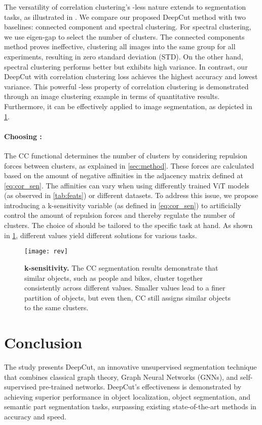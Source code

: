 \documentclass[10pt,twocolumn,letterpaper]{article}
\begin{document}
The versatility of correlation clustering's -less nature extends to segmentation tasks, as illustrated in . We compare our proposed DeepCut method with two baselines: connected component and spectral clustering. For spectral clustering, we use eigen-gap\cite{von2007tutorial} to select the number of clusters. The connected components method proves ineffective, clustering all images into the same group for all experiments, resulting in zero standard deviation (STD). On the other hand, spectral clustering performs better but exhibits high variance. In contrast, our DeepCut with correlation clustering loss achieves the highest accuracy and lowest variance. This powerful -less property of correlation clustering is demonstrated through an image clustering example in terms of quantitative results. Furthermore, it can be effectively applied to image segmentation, as depicted in \cref{fig:rev}.

\paragraph{Choosing :}
The CC functional determines the number of clusters by considering repulsion forces between clusters, as explained in \cref{sec:method}. These forces are calculated based on the amount of negative affinities in the adjacency matrix defined at \cref{eq:cor_sen}. The affinities can vary when using differently trained ViT models (as observed in \cref{tab:feats}) or different datasets. To address this issue, we propose introducing a k-sensitivity variable  (as defined in \cref{eq:cor_sen}) to artificially control the amount of repulsion forces and thereby regulate the number of clusters. The choice of  should be tailored to the specific task at hand. As shown in \cref{fig:rev}, different  values yield different solutions for various tasks.




 \begin{figure}[t]
\texttt{[image: rev]}
\caption{
\textbf{k-sensitivity.} The CC segmentation results demonstrate that similar objects, such as people and bikes, cluster together consistently across different  values. Smaller  values lead to a finer partition of objects, but even then, CC still assigns similar objects to the same clusters.
}
\label{fig:rev}
 \end{figure}



\section{Conclusion}
The study presents DeepCut, an innovative unsupervised segmentation technique that combines classical graph theory, Graph Neural Networks (GNNs), and self-supervised pre-trained networks. DeepCut's effectiveness is demonstrated by achieving superior performance in object localization, object segmentation, and semantic part segmentation tasks, surpassing existing state-of-the-art methods in accuracy and speed.
\end{document}
